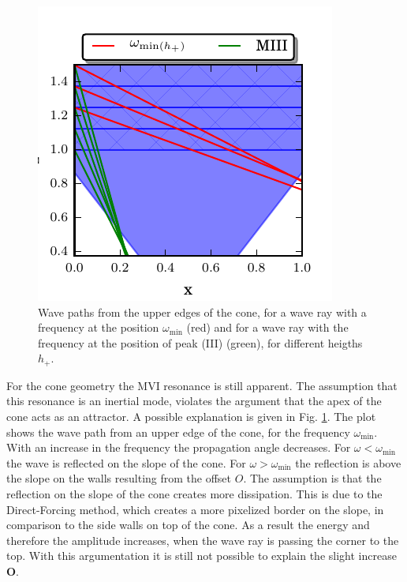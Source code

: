 \begin{figure}[!t]
  \begin{minipage}[c]{0.4\textwidth}
      \centering
      \includegraphics{gfx/cone/discussion/corners.pdf}
  \end{minipage}
  \hfill
  \begin{minipage}[c]{0.5\textwidth}
      \caption{\label{fig:conediscuss:corners}
        Wave paths from the upper edges of the cone,
        for a wave ray with a frequency at the position $\omega_{\text{min}}$ (red) and
        for a wave ray with the frequency at the position of peak (\RN{3}) (green),
            for different heigths $h_+$.
      }
  \end{minipage}
\end{figure}



For the cone geometry the M\RN{6} resonance is still apparent.
The assumption that this resonance is an inertial mode,
violates the argument that the apex of the cone acts as
an attractor.
A possible explanation is given in Fig. \ref{fig:conediscuss:corners}.
The plot shows the wave path from an upper edge of the cone, for the frequency $\omega_{\text{min}}$.
With an increase in the frequency the propagation angle decreases.
For $\omega<\omega_{\text{min}}$ the wave is reflected on the slope of the cone.
For $\omega>\omega_{\text{min}}$ the reflection is above the slope on the walls resulting from the offset $O$.
The assumption is that the reflection on the slope of the cone creates more dissipation.
This is due to the Direct-Forcing method, which creates a more pixelized border on the slope,
in comparison to the side walls on top of the cone.
As a result the energy and therefore the amplitude increases,
when the wave ray is passing the corner to the top.
With this argumentation it is still not possible to explain the slight increase \textbf{O}.



